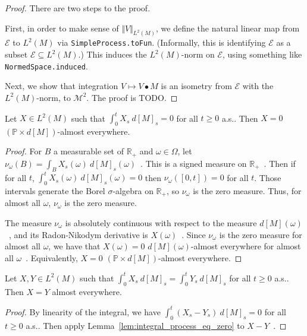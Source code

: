 \begin{proof}
  There are two steps to the proof.

  First, in order to make sense of $\Vert V \Vert_{L^2(M)}$,
  we define the natural linear map from $\mathcal{E}$ to $L^2(M)$ via \texttt{SimpleProcess.toFun}.
  (Informally, this is identifying $\mathcal{E}$ as a subset $\mathcal{E} \subseteq L^2(M)$.)
  This induces the $L^2(M)$-norm on $\mathcal{E}$, using something like \texttt{NormedSpace.induced}.

  Next, we show that integration $V \mapsto V \bullet M$ is an isometry from $\mathcal{E}$
  with the $L^2(M)$-norm, to $\mathcal{M}^2$. The proof is TODO.
\end{proof}


\begin{lemma}\label{lem:integral_process_eq_zero}
Let $X\in L^2(M)$ such that $\int_0^t X_s \: d[M]_s = 0$ for all $t \ge 0$ a.s.. Then $X = 0$ $(\mathbb{P} \times d[M])$-almost everywhere.
\end{lemma}

\begin{proof}
For $B$ a measurable set of $\mathbb{R}_+$ and $\omega \in \Omega$, let $\nu_\omega(B) = \int_B X_s(\omega) \: d[M]_s(\omega)$~. This is a signed measure on $\mathbb{R}_+$~.
Then if for all $t$, $\int_0^t X_s(\omega) \: d[M]_s(\omega) = 0$ then $\nu_\omega([0,t]) = 0$ for all $t$.
Those intervals generate the Borel $\sigma$-algebra on $\mathbb{R}_+$, so $\nu_\omega$ is the zero measure.
Thus, for almost all $\omega$, $\nu_\omega$ is the zero measure.

The measure $\nu_\omega$ is absolutely continuous with respect to the measure $d[M](\omega)$~, and its Radon-Nikodym derivative is $X(\omega)$~.
Since $\nu_\omega$ is the zero measure for almost all $\omega$, we have that $X(\omega) = 0$ $d[M](\omega)$-almost everywhere for almost all $\omega$~.
Equivalently, $X = 0$ $(\mathbb{P} \times d[M])$-almost everywhere.
\end{proof}


\begin{lemma}\label{lem:integral_process_injective}
Let $X, Y \in L^2(M)$ such that $\int_0^t X_s \: d[M]_s = \int_0^t Y_s \: d[M]_s$ for all $t \ge 0$ a.s.. Then $X = Y$ almost everywhere.
\end{lemma}

\begin{proof}
By linearity of the integral, we have $\int_0^t (X_s - Y_s) \: d[M]_s = 0$ for all $t \ge 0$ a.s..
Then apply Lemma~\ref{lem:integral_process_eq_zero} to $X - Y$~.
\end{proof}


